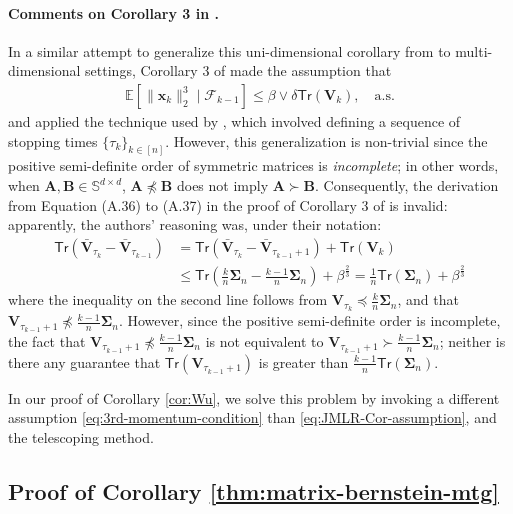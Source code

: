\paragraph{Comments on Corollary 3 in \cite{JMLR2019CLT}.} In a similar attempt to generalize this uni-dimensional corollary from \cite{rollin2018} to multi-dimensional settings, Corollary 3 of \cite{JMLR2019CLT} made the assumption that 
\begin{align}\label{eq:JMLR-Cor-assumption}
\mathbb{E}[\|\bm{x}_k\|_2^3 \mid \mathcal{F}_{k-1}] \leq \beta \vee \delta \mathsf{Tr}(\bm{V}_k), \quad \text{a.s.}
\end{align}
and applied the technique used by \cite{rollin2018}, which involved defining a sequence of stopping times $\{\tau_k\}_{k \in [n]}$. However, this generalization is non-trivial since the positive semi-definite order of symmetric matrices is \emph{incomplete}; in other words, when $\bm{A},\bm{B} \in \mathbb{S}^{d \times d}$, $\bm{A} \npreceq \bm{B}$ does not imply $\bm{A} \succ \bm{B}$. Consequently, the derivation from Equation (A.36) to (A.37) in the proof of Corollary 3 of \cite{JMLR2019CLT} is invalid: apparently, the authors' reasoning was, under their notation:
\begin{align*}
\mathsf{Tr}(\bar{\bm{V}}_{\tau_k} - \bar{\bm{V}}_{\tau_{k-1}})&= \mathsf{Tr}(\bar{\bm{V}}_{\tau_k} - \bar{\bm{V}}_{\tau_{k-1} + 1}) + \mathsf{Tr}(\bm{V}_k) \\ 
&\leq\mathsf{Tr}\left( \frac{k}{n}\bm{\Sigma}_n - \frac{k-1}{n}\bm{\Sigma}_n\right) + \beta^{\frac{2}{3}} = \frac{1}{n}\mathsf{Tr}(\bm{\Sigma}_n)+ \beta^{\frac{2}{3}}
\end{align*}
where the inequality on the second line follows from $\bm{V}_{\tau_k} \preceq \frac{k}{n}\bm{\Sigma}_n$, and that $\bm{V}_{\tau_{k-1}+1} \npreceq \frac{k-1}{n}\bm{\Sigma}_n$. However, since the positive semi-definite order is incomplete, the fact that $\bm{V}_{\tau_{k-1}+1} \npreceq \frac{k-1}{n}\bm{\Sigma}_n$ is not equivalent to $\bm{V}_{\tau_{k-1}+1} \succ \frac{k-1}{n}\bm{\Sigma}_n$; neither is there any guarantee that $\mathsf{Tr}(\bm{V}_{\tau_{k-1}+1})$ is greater than $\frac{k-1}{n}\mathsf{Tr}(\bm{\Sigma}_n)$.

In our proof of Corollary \ref{cor:Wu}, we solve this problem by invoking a different assumption \eqref{eq:3rd-momentum-condition} than \eqref{eq:JMLR-Cor-assumption}, and the telescoping method. 

\subsection{Proof of Corollary \ref{thm:matrix-bernstein-mtg}}\label{app:proof-matrix-berstein-mtg}
\label{app:proof-matrix-bernstein-mtg}

